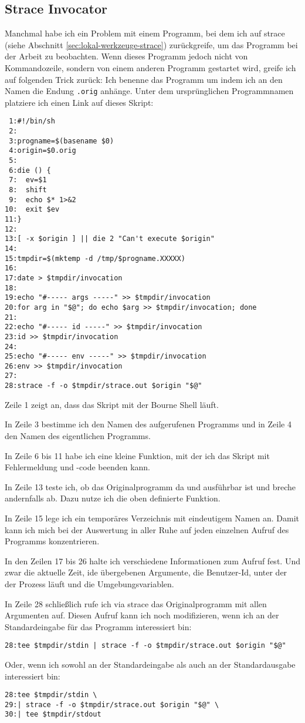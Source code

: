 \begin{normaltext}
  \subsection{Strace Invocator}
  Manchmal habe ich ein Problem mit einem Programm, bei dem ich auf strace
  (siehe Abschnitt \ref{sec:lokal-werkzeuge-strace}) zurückgreife,
  um das Programm bei der Arbeit zu beobachten.
  Wenn dieses Programm jedoch nicht von Kommandozeile,
  sondern von einem anderen Programm gestartet wird, greife ich auf folgenden
  Trick zurück: Ich benenne das Programm um indem ich an den Namen die Endung
  \verb?.orig? anhänge. Unter dem ursprünglichen Programmnamen platziere ich
  einen Link auf dieses Skript:
  \begin{verbatim}
 1:#!/bin/sh
 2:
 3:progname=$(basename $0)
 4:origin=$0.orig
 5:
 6:die () {
 7:  ev=$1
 8:  shift
 9:  echo $* 1>&2
10:  exit $ev
11:}
12:
13:[ -x $origin ] || die 2 "Can't execute $origin"
14:
15:tmpdir=$(mktemp -d /tmp/$progname.XXXXX)
16:
17:date > $tmpdir/invocation
18:
19:echo "#----- args -----" >> $tmpdir/invocation
20:for arg in "$@"; do echo $arg >> $tmpdir/invocation; done
21:
22:echo "#----- id -----" >> $tmpdir/invocation
23:id >> $tmpdir/invocation
24:
25:echo "#----- env -----" >> $tmpdir/invocation
26:env >> $tmpdir/invocation
27:
28:strace -f -o $tmpdir/strace.out $origin "$@"
  \end{verbatim}
  Zeile 1 zeigt an, dass das Skript mit der Bourne Shell läuft.

  In Zeile 3 bestimme ich den Namen des aufgerufenen Programms und in Zeile 4
  den Namen des eigentlichen Programms.

  In Zeile 6 bis 11 habe ich eine kleine Funktion, mit der ich das Skript mit
  Fehlermeldung und -code beenden kann.

  In Zeile 13 teste ich, ob das Originalprogramm da und ausführbar ist und
  breche andernfalls ab. Dazu nutze ich die oben definierte Funktion.

  In Zeile 15 lege ich ein temporäres Verzeichnis mit eindeutigem Namen an.
  Damit kann ich mich bei der Auswertung in aller Ruhe auf jeden einzelnen
  Aufruf des Programms konzentrieren.

  In den Zeilen 17 bis 26 halte ich verschiedene Informationen zum Aufruf
  fest. Und zwar die aktuelle Zeit, ide übergebenen Argumente, die
  Benutzer-Id, unter der der Prozess läuft und die Umgebungsvariablen.

  In Zeile 28 schließlich rufe ich via strace das Originalprogramm mit allen
  Argumenten auf. Diesen Aufruf kann ich noch modifizieren, wenn ich an der
  Standardeingabe für das Programm interessiert bin:
  \begin{verbatim}
28:tee $tmpdir/stdin | strace -f -o $tmpdir/strace.out $origin "$@"
  \end{verbatim}
  Oder, wenn ich sowohl an der Standardeingabe als auch an der Standardausgabe
  interessiert bin:
  \begin{verbatim}
28:tee $tmpdir/stdin \
29:| strace -f -o $tmpdir/strace.out $origin "$@" \
30:| tee $tmpdir/stdout
  \end{verbatim}
\end{normaltext}

